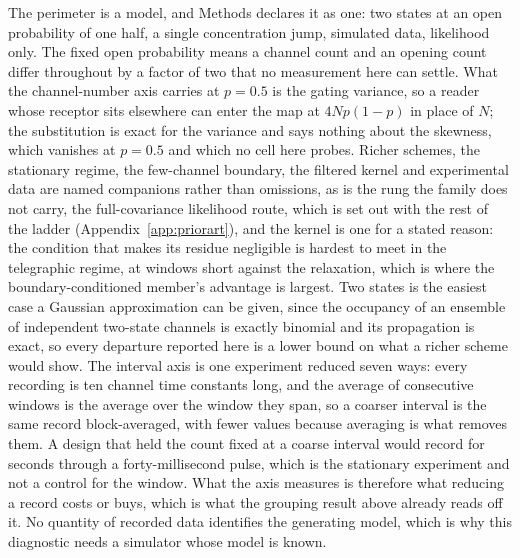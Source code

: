 The perimeter is a model, and Methods declares it as one: two states at an open probability of one half, a single concentration jump, simulated data, likelihood only. The fixed open probability means a channel count and an opening count differ throughout by a factor of two that no measurement here can settle. What the channel-number axis carries at $p=0.5$ is the gating variance, so a reader whose receptor sits elsewhere can enter the map at $4Np(1-p)$ in place of $N$; the substitution is exact for the variance and says nothing about the skewness, which vanishes at $p=0.5$ and which no cell here probes. Richer schemes, the stationary regime, the few-channel boundary, the filtered kernel and experimental data are named companions rather than omissions, as is the rung the family does not carry, the full-covariance likelihood route, which is set out with the rest of the ladder (Appendix~\ref{app:priorart}), and the kernel is one for a stated reason: the condition that makes its residue negligible is hardest to meet in the telegraphic regime, at windows short against the relaxation, which is where the boundary-conditioned member's advantage is largest. Two states is the easiest case a Gaussian approximation can be given, since the occupancy of an ensemble of independent two-state channels is exactly binomial and its propagation is exact, so every departure reported here is a lower bound on what a richer scheme would show. The interval axis is one experiment reduced seven ways: every recording is ten channel time constants long, and the average of consecutive windows is the average over the window they span, so a coarser interval is the same record block-averaged, with fewer values because averaging is what removes them. A design that held the count fixed at a coarse interval would record for seconds through a forty-millisecond pulse, which is the stationary experiment and not a control for the window. What the axis measures is therefore what reducing a record costs or buys, which is what the grouping result above already reads off it. No quantity of recorded data identifies the generating model, which is why this diagnostic needs a simulator whose model is known.

